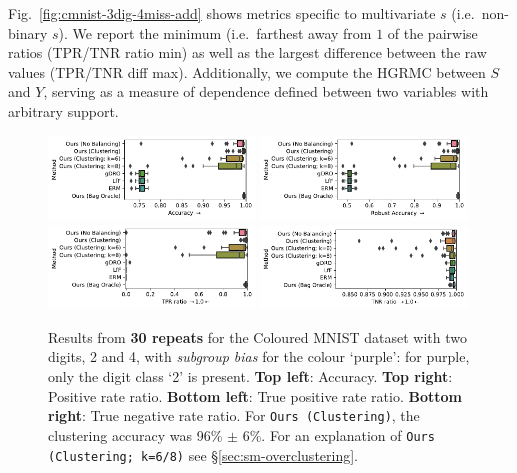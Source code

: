 Fig.~\ref{fig:cmnist-3dig-4miss-add} shows metrics specific to multivariate $s$ (i.e.\ non-binary
$s$). 
%
We report the minimum (i.e.\ farthest away from \(1\) of the pairwise ratios (\ac{TPR}/\ac{TNR}
ratio min) as well as the largest difference between the raw values (\ac{TPR}/\ac{TNR} diff max). 
%
Additionally, we compute the \ac{HGRMC} between $S$ and $Y$, serving as a measure of dependence
defined between two variables with arbitrary support.
%
\begin{figure}[htp]
  \centering
  \includegraphics[width=0.49\textwidth]{supmatch/figures/cmnist/subgroup_bias_oc/cmnist_2v4_partial_overcluster_acc.pdf}
  \includegraphics[width=0.49\textwidth]{supmatch/figures/cmnist/subgroup_bias_oc/cmnist_2v4_partial_overcluster_acc-min.pdf}
  \includegraphics[width=0.49\textwidth]{supmatch/figures/cmnist/subgroup_bias_oc/cmnist_2v4_partial_overcluster_tprr.pdf}
    \includegraphics[width=0.49\textwidth]{supmatch/figures/cmnist/subgroup_bias_oc/cmnist_2v4_partial_overcluster_tnrr.pdf}
  \caption{
    Results from \textbf{30 repeats} for the Coloured MNIST dataset with two digits, 2 and 4, with
    \emph{subgroup bias} for the colour `{\color{purple}purple}': for {\color{purple}purple}, only
    the digit class `2' is present.
    \textbf{Top left}: Accuracy.
    \textbf{Top right}: Positive rate ratio.
    \textbf{Bottom left}: True positive rate ratio.
    \textbf{Bottom right}: True negative rate ratio.
    For \texttt{Ours (Clustering)}, the clustering accuracy was 96\% $\pm$ 6\%.
    For an explanation of \texttt{Ours (Clustering; k=6/8)} see \S\ref{sec:sm-overclustering}.
  }%
  \label{fig:cmnist-2v4-partial-add}
\end{figure}
